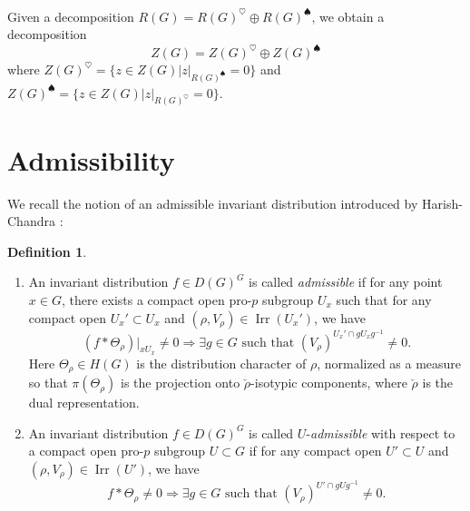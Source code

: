 \documentclass[12pt]{amsart}
\theoremstyle{definition}
\newtheorem{definition}[thm]{Definition}
\numberwithin{equation}{section}
\theoremstyle{remark}
\newcommand{\Irr}{\operatorname{Irr}}
\begin{document}
Given a decomposition $R(G)=R(G)^{\heartsuit}\oplus R(G)^{\spadesuit}$, we obtain a decomposition
\[Z(G)=Z(G)^{\heartsuit}\oplus Z(G)^\spadesuit\] 
where $Z(G)^{\heartsuit}=\{z\in Z(G)|z|_{R(G)^{\spadesuit}}=0 \}$
and $Z(G)^{\spadesuit}=\{z\in Z(G)|z|_{R(G)^{\heartsuit}}=0 \}$.

\section{Admissibility}
We recall the notion of an admissible invariant distribution introduced by Harish-Chandra \cite[Definition 15.1]{HC99}:

\begin{definition}

\begin{enumerate}
    \item 
     An invariant distribution $f\in D(G)^G$ 
     is called 
    \emph{admissible} if for any point $x\in G$, there exists a compact open pro-$p$ subgroup 
    $U_x$ such that for any compact open $U_x'\subset U_x$
 and $(\rho,V_\rho)\in \Irr(U_x')$, we have 
\[\left(f*\Theta_\rho\right)|_{xU_x}\neq0\Rightarrow \exists g\in G\text{ such that } (V_\rho)^{U_x'\cap gU_xg^{-1}}\neq 0.\]
    Here $\Theta_\rho\in H(G)$ is the distribution character of $\rho$, normalized as a measure so that $\pi(\Theta_{\rho})$ is the projection onto $\check\rho$-isotypic components, where $\check\rho$ is the dual representation.
\item  An invariant distribution $f\in D(G)^G$ 
     is called 
$U$-\emph{admissible} with respect to a compact open pro-$p$ subgroup $U\subset G$ if  
for any compact open $U'\subset U$
 and $(\rho,V_\rho)\in \Irr(U')$, we have 
\[f*\Theta_\rho\neq0\Rightarrow \exists g\in G\text{ such that } (V_\rho)^{U'\cap gUg^{-1}}\neq 0.\]

\end{enumerate}
\end{definition}
\end{document}
